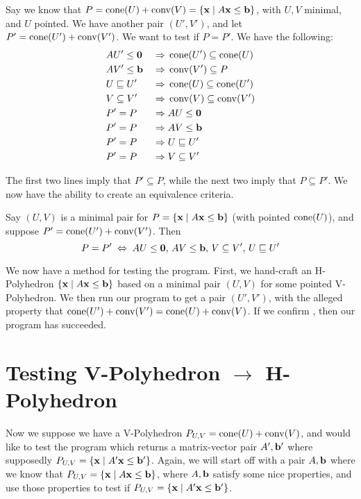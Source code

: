 Say we know that $P = \operatorname{cone}(U) + \operatorname{conv}(V) = \left\{\mathbf{x}\;|\; A\mathbf{x}\leq \mathbf{b}\right\}$, with $U,V$ minimal, and $U$ pointed.  We have another pair $(U',V')$, and let $P'=\operatorname{cone}(U') + \operatorname{conv}(V')$.  We want to test if $P = P'$.  We have the following:
\begin{alignat*}{2}
	 & AU'\leq\mathbf{0} \;        & \Rightarrow & \; \operatorname{cone}(U') \subseteq \operatorname{cone}(U) \\
	 & AV'\leq\mathbf{b} \;        & \Rightarrow & \; \operatorname{conv}(V') \subseteq P        \\
	 & U \sqsubseteq U' \; & \Rightarrow & \; \operatorname{cone}(U) \subseteq \operatorname{cone}(U') \\
	 & V \subseteq V'   \; & \Rightarrow & \; \operatorname{conv}(V) \subseteq \operatorname{conv}(V') \\
	 & P' = P \;           & \Rightarrow & \; AU\leq\mathbf{0}                     \\
	 & P' = P \;           & \Rightarrow & \; AV\leq\mathbf{b}                     \\
	 & P' = P \;           & \Rightarrow & \; U \sqsubseteq U'             \\
	 & P' = P \;           & \Rightarrow & \; V \subseteq V'
\end{alignat*}

The first two lines imply that $P'\subseteq P$, while the next two imply that $P\subseteq P'$.  We now have the ability to create an equivalence criteria.

\begin{EqCriteria}\label{eq_hp_vp}
	Say $(U,V)$ is a minimal pair for $P = \left\{\mathbf{x}\;|\; A\mathbf{x}\leq \mathbf{b}\right\}$ (with pointed $\operatorname{cone}(U)$), and suppose $P' = \operatorname{cone}(U') + \operatorname{conv}(V')$.  Then
	\[ P = P' \;\Leftrightarrow\; AU\leq\mathbf{0},\, AV\leq\mathbf{b},\, V\subseteq V',\, U\sqsubseteq U'\]
\end{EqCriteria}

\begin{Test}\label{test_hp_to_vp}
	We now have a method for testing the program.  First, we hand-craft an H-Polyhedron $\left\{\mathbf{x}\;|\; A\mathbf{x}\leq \mathbf{b}\right\}$ based on a minimal pair $(U,V)$ for some pointed V-Polyhedron. We then run our program to get a pair $(U',V')$, with the alleged property that $\operatorname{cone}(U') + \operatorname{conv}(V') = \operatorname{cone}(U) + \operatorname{conv}(V)$.  If we confirm , then our program has succeeded.
\end{Test}

\section{Testing V-Polyhedron $\to$ H-Polyhedron}
Now we suppose we have a V-Polyhedron $P_{U,V} = \operatorname{cone}(U) + \operatorname{conv}(V)$, and would like to test the program which returns a matrix-vector pair $A',\mathbf{b}'$ where supposedly $P_{U,V} = \left\{\mathbf{x}\;|\; A'\mathbf{x}\leq \mathbf{b}'\right\}$.  Again, we will start off with a pair $A,\mathbf{b}$ where we know that $P_{U,V} = \left\{\mathbf{x}\;|\; A\mathbf{x}\leq \mathbf{b}\right\}$, where $A,\mathbf{b}$ satisfy some nice properties, and use those properties to test if $P_{U,V} = \left\{\mathbf{x}\;|\; A'\mathbf{x}\leq \mathbf{b}'\right\}$.


